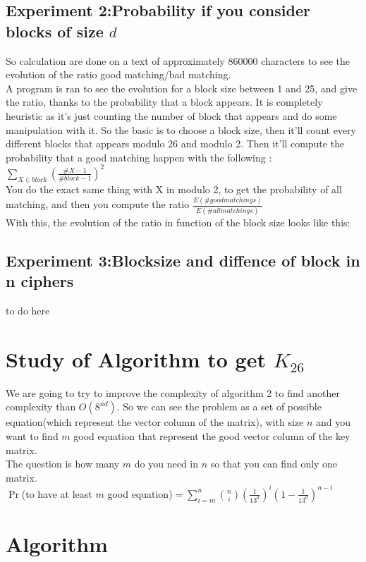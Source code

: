 \documentclass{article}
\begin{document}
\subsection{Experiment 2:Probability if you consider blocks of size $d$}

So calculation are done on a text of approximately $860000$ characters to see the evolution of the ratio good matching/bad matching.\\
A program is ran to see the evolution for a block size between 1 and 25, and give the ratio, thanks to the probability that a block appears. It is completely heuristic as it's just counting the number of block that appears and do some manipulation with it.
So the basic is to choose a block size, then it'll count every different blocks that appears modulo 26 and modulo 2.
Then it'll compute the probability that a good matching happen with the following : $\sum_{X \in block}({\frac{\#X -1}{\#block -1}})^2 $\\
You do the exact same thing with X in modulo 2, to get the probability of all matching, and then you compute the ratio $\frac{E(\# good matchings)}{E(\# all matchings)}$\\
With this, the evolution of the ratio in function of the block size looks like this:\\

\subsection{Experiment 3:Blocksize and diffence of block in n ciphers}

to do here

\section{Study of Algorithm to get $K_{26}$}
We are going to try to improve the complexity of algorithm 2 to find another complexity than $O(8^{nd})$.
So we can see the problem as a set of possible equation(which represent the vector column of the matrix), with size $n$ and you want to find $m$ good equation that represent the good vector column of the key matrix.\\
The question is how many $m$ do you need in $n$ so that you can find only one matrix.\\
$\Pr$(to have at least $m$ good equation)$=\sum_{i=m}^{n}{{n \choose i}(\frac{1}{13^d})^i (1-\frac{1}{13^d})^{n-i}}$

\appendix
\newpage
\section{Algorithm}
\end{document}
